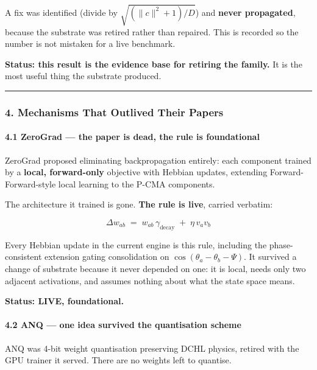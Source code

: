 \documentclass[
  11pt,
  a4paper,
]{article}
\begin{document}
A fix was identified (divide by \(\sqrt{(\lVert c\rVert^2+1)/D}\)) and
\textbf{never propagated}, because the substrate was retired rather than
repaired. This is recorded so the number is not mistaken for a live
benchmark.

\textbf{Status: this result is the evidence base for retiring the
family.} It is the most useful thing the substrate produced.

\begin{center}\rule{0.5\linewidth}{0.5pt}\end{center}

\subsubsection{4. Mechanisms That Outlived Their
Papers}\label{mechanisms-that-outlived-their-papers}

\paragraph{4.1 ZeroGrad --- the paper is dead, the rule is
foundational}\label{zerograd-the-paper-is-dead-the-rule-is-foundational}

ZeroGrad proposed eliminating backpropagation entirely: each component
trained by a \textbf{local, forward-only} objective with Hebbian
updates, extending Forward-Forward-style local learning to the P-CMA
components.

The architecture it trained is gone. \textbf{The rule is live}, carried
verbatim:

\[
\Delta w_{ab} \;=\; w_{ab}\,\gamma_{\text{decay}} \;+\; \eta\, v_a v_b
\]

Every Hebbian update in the current engine is this rule, including the
phase-consistent extension gating consolidation on
\(\cos(\theta_a - \theta_b - \Psi)\). It survived a change of substrate
because it never depended on one: it is local, needs only two adjacent
activations, and assumes nothing about what the state space means.

\textbf{Status: LIVE, foundational.}

\paragraph{4.2 ANQ --- one idea survived the quantisation
scheme}\label{anq-one-idea-survived-the-quantisation-scheme}

ANQ was 4-bit weight quantisation preserving DCHL physics, retired with
the GPU trainer it served. There are no weights left to quantise.
\end{document}
